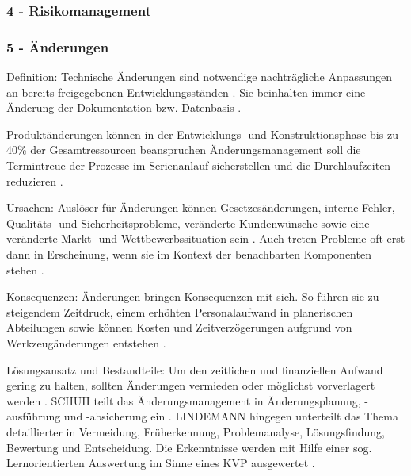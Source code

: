 \subsubsection*{4 - Risikomanagement}
\subsubsection*{5 - Änderungen}

Definition: 
Technische Änderungen sind notwendige nachträgliche Anpassungen an bereits freigegebenen Entwicklungsständen \cite{Zanner2002}. Sie beinhalten immer eine Änderung der Dokumentation bzw. Datenbasis \cite[47]{Niemerg1997}. 	


Produktänderungen können in der Entwicklungs- und Konstruktionsphase bis zu 40\% der Gesamtressourcen beanspruchen \cite{Lindemann1998}
Änderungsmanagement soll die Termintreue der Prozesse im Serienanlauf sicherstellen und die Durchlaufzeiten reduzieren \cite[216]{Schuh2008}. 

Ursachen: 
Auslöser für Änderungen können Gesetzesänderungen, interne Fehler, Qualitäts- und Sicherheitsprobleme, veränderte Kundenwünsche sowie eine veränderte Markt- und Wettbewerbssituation sein \cite{Zanner2002}. Auch treten Probleme oft erst dann in Erscheinung, wenn sie im Kontext der benachbarten Komponenten stehen \cite[24]{Kuhn2002}.

Konsequenzen: 
Änderungen bringen Konsequenzen mit sich. So führen sie zu steigendem Zeitdruck, einem erhöhten Personalaufwand in planerischen Abteilungen sowie können Kosten und Zeitverzögerungen aufgrund von Werkzeugänderungen entstehen \cite[24]{Kuhn2002}. 

Lösungsansatz und Bestandteile: 
Um den zeitlichen und finanziellen Aufwand gering zu halten, sollten Änderungen vermieden oder möglichst vorverlagert werden \cite{Schuh2008, Jania2004, Ass98}. 
SCHUH teilt das Änderungsmanagement in Änderungsplanung, -ausführung und -absicherung ein \cite[217]{Schuh2008}. 
LINDEMANN hingegen unterteilt das Thema detaillierter in Vermeidung, Früherkennung, Problemanalyse, Lösungsfindung, Bewertung und Entscheidung. Die Erkenntnisse werden mit Hilfe einer sog. Lernorientierten Auswertung im Sinne eines KVP ausgewertet \cite{Lindemann1998}. 

